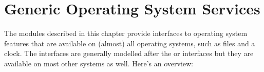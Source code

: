 \chapter{Generic Operating System Services}
\label{allos}

The modules described in this chapter provide interfaces to operating
system features that are available on (almost) all operating systems,
such as files and a clock.  The interfaces are generally modelled
after the \UNIX{} or \C{} interfaces but they are available on most
other systems as well.  Here's an overview:

\localmoduletable
